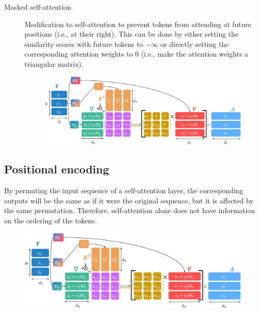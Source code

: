 \begin{description}
        \begin{description}
            \item[Masked self-attention] 
                Modification to self-attention to prevent tokens from attending at future positions (i.e., at their right). This can be done by either setting the similarity scores with future tokens to $-\infty$ or directly setting the corresponding attention weights to $0$ (i.e., make the attention weights a triangular matrix).

                \begin{figure}[H]
                    \centering
                    \includegraphics[width=0.8\linewidth]{./img/_masked_self_attention.jpg}
                \end{figure}
        \end{description}
\end{description}


\subsection{Positional encoding}

\begin{remark}
    By permuting the input sequence of a self-attention layer, the corresponding outputs will be the same as if it were the original sequence, but it is affected by the same permutation. Therefore, self-attention alone does not have information on the ordering of the tokens.

    \begin{figure}[H]
        \centering
        \includegraphics[width=0.7\linewidth]{./img/_self_attention_permutation.jpg}
    \end{figure}
\end{remark}

